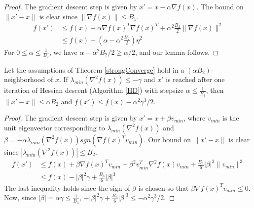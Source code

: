 \begin{proof}
The gradient descent step is given by $x' = x - \alpha \nabla f(x)$. The bound on $\|x' - x\|$ is clear since $\|\nabla f(x) \| \leq B_1$.
\begin{align*}
f(x') &\leq f(x) - \alpha \nabla f(x)^T\nabla f(x)^T + \alpha^2\frac{B_2}{2} \|\nabla f(x)\|^2 \\
&\leq f(x) - (\alpha - \alpha^2 \frac{B_2}{2}) \eta^2 
\end{align*}
For $0 \leq \alpha \leq \frac{1}{B_2}$, we have $\alpha - \alpha^2B_2/2 \geq \alpha/2$, and our lemma follows.
\end{proof}

\begin{lemma}\label{HessianDecrease}
Let the assumptions of Theorem \ref{strongConverge} hold in a $(\alpha B_2)$-neighborhood of $x$. If $\lambda_{min}(\nabla^2 f (x)) \leq -\gamma$ and $x'$ is reached after one iteration of Hessian descent (Algorithm \ref{HD}) with stepsize $\alpha \leq \frac{1}{B_3}$, then $\|x' - x\| \leq \alpha B_2$ and $f(x') \leq f(x) - \alpha^2 \gamma^3/2$.
\end{lemma}

\begin{proof}
The gradient descent step is given by $x' = x + \beta v_{min}$, where $v_{min}$ is the unit eigenvector corresponding to $\lambda_{min}(\nabla^2f(x))$ and $\beta = -\alpha\lambda_{min}(\nabla^2 f(x))sgn(\nabla f(x)^Tv_{min})$. Our bound on $\|x' - x\|$ is clear since $|\lambda_{min}(\nabla^2 f(x))| \leq B_2$.
\begin{align*}
f(x') &\leq f(x) + \beta\nabla f(x)^Tv_{min} + \beta^2 v_{min}^T\nabla^2f(x)v_{min} + \frac{B_3}{6} |\beta|^3 \|v_{min}\|^3 \\
&\leq f(x) - |\beta|^2 \gamma + \frac{B_3}{6} |\beta|^3
\end{align*}
The last inequality holds since the sign of $\beta$ is chosen so that $\beta \nabla f(x)^Tv_{min} \leq 0$. Now, since $|\beta| = \alpha \gamma \leq \frac{\gamma}{B_3}$, $-|\beta|^2\gamma + \frac{B_3}{6} |\beta|^3 \leq - \alpha^2 \gamma^3/2$. 
\end{proof}



